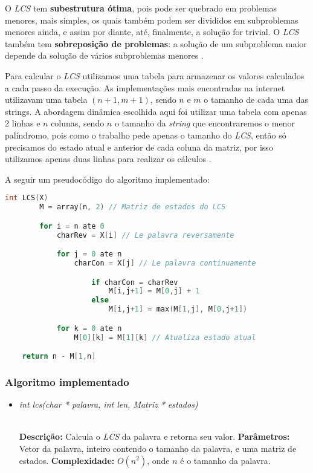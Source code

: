 \documentclass[12pt]{article}
\begin{document}
    O \textit{LCS} tem \textbf{subestrutura ótima}, pois pode ser quebrado em problemas menores, mais simples, os quais também podem ser divididos em subproblemas menores ainda, e assim por diante, até, finalmente, a solução for trivial. O \textit{LCS} também tem \textbf{sobreposição de problemas}: a solução de um subproblema maior depende da solução de vários subproblemas menores \cite{wikilcs}.

    Para calcular o \textit{LCS} utilizamos uma tabela para armazenar os valores calculados a cada passo da execução. As implementações mais encontradas na internet utilizavam uma tabela $(n+1, m+1)$, sendo $n$ e $m$ o tamanho de cada uma das strings. A abordagem dinâmica escolhida aqui foi utilizar uma tabela com apenas $2$ linhas e $n$ colunas, sendo $n$ o tamanho da \textit{string} que encontraremos o menor palíndromo, pois como o trabalho pede apenas o tamanho do \textit{LCS}, então só precisamos do estado atual e anterior de cada coluna da matriz, por isso utilizamos apenas duas linhas para realizar os cálculos \cite{hirsch}.

    A seguir um pseudocódigo do algoritmo implementado:

    \newpage

    \begin{lstlisting}[language=c]
    int LCS(X)
        M = array(n, 2) // Matriz de estados do LCS

        for i = n ate 0
            charRev = X[i] // Le palavra reversamente

            for j = 0 ate n
                charCon = X[j] // Le palavra continuamente

                    if charCon = charRev
                        M[i,j+1] = M[0,j] + 1
                    else
                        M[i,j+1] = max(M[1,j], M[0,j+1])

            for k = 0 ate n
                M[0][k] = M[1][k] // Atualiza estado atual

    return n - M[1,n]
    \end{lstlisting}


\subsubsection{Algoritmo implementado}

\begin{itemize}
 \item \begin{large}\textit{int lcs(char * palavra, int len, Matriz * estados)}\end{large}\\
 \subitem \textbf{Descrição:} Calcula o \textit{LCS} da palavra e retorna seu valor.
 \subitem \textbf{Parâmetros:} Vetor da palavra, inteiro contendo o tamanho da palavra, e uma matriz de estados.
 \subitem \textbf{Complexidade:} $O(n^2)$, onde $n$ é o tamanho da palavra.
\end{itemize}
\end{document}
